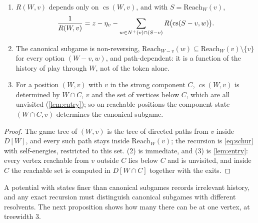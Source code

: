\begin{lemma}\label{lem:canonical}
\begin{enumerate}[label=\textup{(\arabic*)}]
\item $R(W,v)$ depends only on $\operatorname{cs}(W,v)$, and with $S=\mathrm{Reach}_W(v)$,
\[
\frac1{R(W,v)}=z-\eta_v-\sum_{w\in\nplus(v)\cap(S-v)}R\bigl(\operatorname{cs}(S-v,w)\bigr).
\]
\item The canonical subgame is non-reversing, $\mathrm{Reach}_{W-v}(w)\subseteq\mathrm{Reach}_W(v)\setminus\{v\}$ for every option $(W-v,w)$, and path-dependent: it is a function of the history of play through $W$, not of the token alone.
\item For a position $(W,v)$ with $v$ in the strong component $C$, $\operatorname{cs}(W,v)$ is determined by $W\cap C$, $v$ and the set of vertices below $C$, which are all unvisited \textup{(}\cref{lem:entry}\textup{)}; so on reachable positions the component state $(W\cap C,v)$ determines the canonical subgame.
\end{enumerate}
\end{lemma}
\begin{proof}
The game tree of $(W,v)$ is the tree of directed paths from $v$ inside $D[W]$, and every such path stays inside $\mathrm{Reach}_W(v)$; the recursion is \eqref{eq:schur} with self-energies, restricted to this set. (2) is immediate, and (3) is \cref{lem:entry}: every vertex reachable from $v$ outside $C$ lies below $C$ and is unvisited, and inside $C$ the reachable set is computed in $D[W\cap C]$ together with the exits.
\end{proof}

A potential with states finer than canonical subgames records irrelevant history, and any exact recursion must distinguish canonical subgames with different resolvents. The next proposition shows how many there can be at one vertex, at treewidth $3$.

